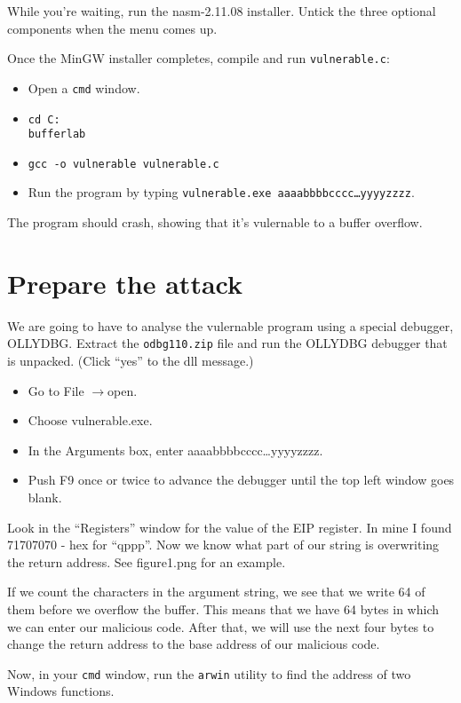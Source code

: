 \documentclass{article}
\begin{document}
While you're waiting, run the nasm-2.11.08 installer.  Untick the three optional components when the 
menu comes up.

Once the MinGW installer completes, compile and run \texttt{vulnerable.c}:
\begin{itemize}
	\item Open a \texttt{cmd} window.
	\item \texttt{cd C:\\bufferlab}
	\item \texttt{gcc -o vulnerable vulnerable.c}
	\item Run the program by typing \texttt{vulnerable.exe aaaabbbbcccc\ldots yyyyzzzz}.
	\end{itemize}

The program should crash, showing that it's vulernable to a buffer overflow.

\section{Prepare the attack}
We are going to have to analyse the vulernable program using a special debugger, OLLYDBG.  Extract
the \texttt{odbg110.zip} file and run the OLLYDBG debugger that is unpacked. (Click ``yes'' to 
the dll message.)

\begin{itemize}
	\item Go to File $\rightarrow$open.
	\item Choose vulnerable.exe.
	\item In the Arguments box, enter aaaabbbbcccc\ldots yyyyzzzz.
	\item Push F9 once or twice to advance the debugger until the top left window 
		goes blank.
\end{itemize}
Look in the ``Registers'' window for the value of the EIP register.  In mine I found 
71707070 - hex for ``qppp''. Now we know what part of our string is overwriting the return address. See figure1.png for an example.

If we count the characters in the argument string, we see that we write 64 of them before we overflow 
the buffer.  This means that we have 64 bytes in which we can enter our malicious code.  After that, we will use the next four bytes to change the return address to the base address of our malicious code.

Now, in your \texttt{cmd} window, run the \texttt{arwin} utility to find the address of two 
Windows functions.
\end{document}
